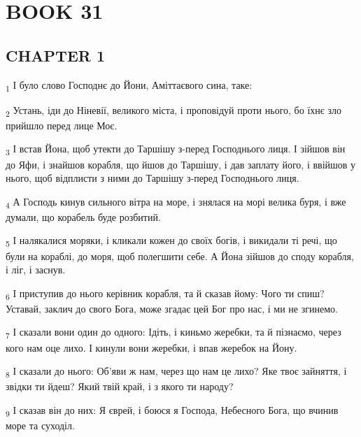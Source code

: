 \section{BOOK 31}
\subsection{CHAPTER 1}
\begin{tcolorbox}
\textsubscript{1} І було слово Господнє до Йони, Аміттаєвого сина, таке:
\end{tcolorbox}
\begin{tcolorbox}
\textsubscript{2} Устань, іди до Ніневії, великого міста, і проповідуй проти нього, бо їхнє зло прийшло перед лице Моє.
\end{tcolorbox}
\begin{tcolorbox}
\textsubscript{3} І встав Йона, щоб утекти до Таршішу з-перед Господнього лиця. І зійшов він до Яфи, і знайшов корабля, що йшов до Таршішу, і дав заплату його, і ввійшов у нього, щоб відплисти з ними до Таршішу з-перед Господнього лиця.
\end{tcolorbox}
\begin{tcolorbox}
\textsubscript{4} А Господь кинув сильного вітра на море, і знялася на морі велика буря, і вже думали, що корабель буде розбитий.
\end{tcolorbox}
\begin{tcolorbox}
\textsubscript{5} І налякалися моряки, і кликали кожен до своїх богів, і викидали ті речі, що були на кораблі, до моря, щоб полегшити себе. А Йона зійшов до споду корабля, і ліг, і заснув.
\end{tcolorbox}
\begin{tcolorbox}
\textsubscript{6} І приступив до нього керівник корабля, та й сказав йому: Чого ти спиш? Уставай, заклич до свого Бога, може згадає цей Бог про нас, і ми не згинемо.
\end{tcolorbox}
\begin{tcolorbox}
\textsubscript{7} І сказали вони один до одного: Ідіть, і киньмо жеребки, та й пізнаємо, через кого нам оце лихо. І кинули вони жеребки, і впав жеребок на Йону.
\end{tcolorbox}
\begin{tcolorbox}
\textsubscript{8} І сказали до нього: Об'яви ж нам, через що нам це лихо? Яке твоє зайняття, і звідки ти йдеш? Який твій край, і з якого ти народу?
\end{tcolorbox}
\begin{tcolorbox}
\textsubscript{9} І сказав він до них: Я єврей, і боюся я Господа, Небесного Бога, що вчинив море та суходіл.
\end{tcolorbox}
